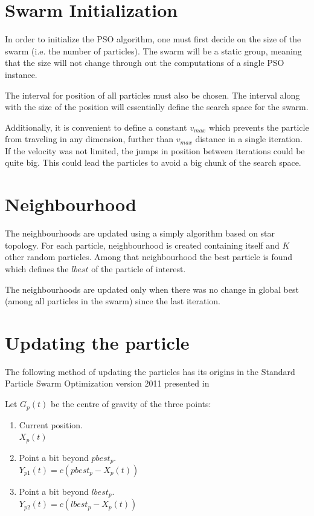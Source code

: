 \documentclass{book}
\begin{document}
\section{Swarm Initialization}
In order to initialize the PSO algorithm, one must first decide on the size of the swarm (i.e. the number of particles). The swarm will be a static group, meaning that the size will not change through out the computations of a single PSO instance.

The interval for position of all particles must also be chosen. The interval along with the size of the position will essentially define the search space for the swarm.

Additionally, it is convenient to define a constant $v_{max}$ which prevents the particle from traveling in any dimension, further than $v_{max}$ distance in a single iteration. If the velocity was not limited, the jumps in position between iterations could be quite big. This could lead the particles to avoid a big chunk of the search space.


\section{Neighbourhood}

The neighbourhoods are updated using a simply algorithm based on star topology.
For each particle, neighbourhood is created containing itself and $K$ other random particles. Among that neighbourhood the best particle is found which defines the $lbest$ of the particle of interest.

The neighbourhoods are updated only when there was no change in global best (among all particles in the swarm) since the last iteration.


\section{Updating the particle}


The following method of updating the particles has its origins in the Standard Particle Swarm Optimization version 2011 presented in~\cite{pso_11}

Let $G_p(t)$ be the centre of gravity of the three points:
\begin{enumerate}
    \item Current position. \\
    $X_p(t)$
    
    \item Point a bit beyond $pbest_p$. \\
    $Y_{p1}(t) = c(pbest_p-X_p(t))$
    
    \item Point a bit beyond $lbest_p$. \\
    $Y_{p2}(t) = c(lbest_p-X_p(t))$
    
\end{enumerate}
\end{document}
